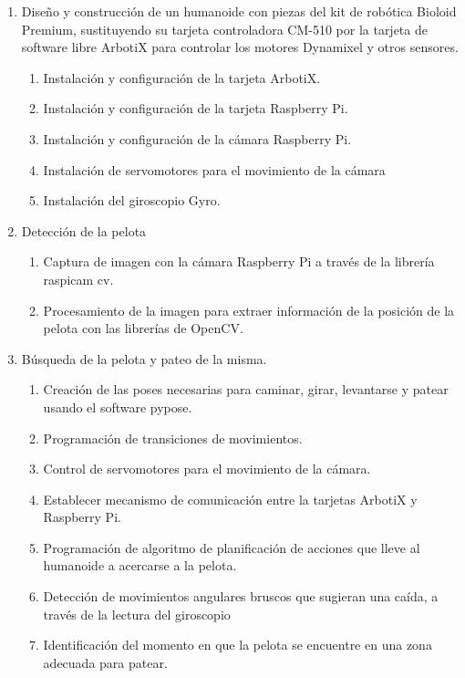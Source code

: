\begin{enumerate}
\item  Diseño y construcción de un humanoide con piezas del kit de robótica Bioloid Premium, sustituyendo su tarjeta controladora
CM-510 por la tarjeta de software libre ArbotiX para controlar los motores Dynamixel y otros sensores.
\begin{enumerate}
\item Instalación y configuración de la tarjeta ArbotiX.
\item Instalación y configuración de la tarjeta Raspberry Pi.
\item Instalación y configuración de la cámara Raspberry Pi.
\item Instalación de servomotores  para el movimiento de la cámara
\item Instalación del giroscopio Gyro.
 
\end{enumerate}


\item Detección de la pelota
\begin{enumerate}
\item Captura de imagen con la cámara Raspberry Pi a través de la librería raspicam cv.
\item Procesamiento de la imagen para extraer información de la posición de la pelota con las librerías de OpenCV.
\end{enumerate}


\item Búsqueda de la pelota y pateo de la misma. 
\begin{enumerate}
\item Creación de las poses necesarias para caminar, girar, levantarse y patear usando el software pypose.
\item Programación de transiciones de movimientos.
\item Control de servomotores para el movimiento de la cámara.
\item Establecer mecanismo de comunicación entre la tarjetas ArbotiX y Raspberry Pi.  
\item Programación de algoritmo de planificación de acciones que lleve al humanoide a acercarse a la pelota.
\item Detección de movimientos angulares bruscos que sugieran una caída, a través de la lectura del giroscopio
\item Identificación del momento en que la pelota se encuentre en una zona adecuada para patear.
\end{enumerate}
\end{enumerate}


